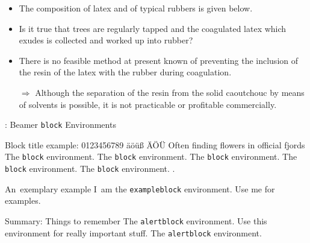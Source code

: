 \begin{frame}{\titleprefix}

	\begin{itemize}
		\item The composition of latex and of typical rubbers is given below.
		\item Is it true that trees are regularly tapped and the coagulated latex which exudes is collected and worked up into rubber?
	\end{itemize}

	\pause

	\begin{itemize}
		\item There is no feasible method at present known of preventing the inclusion of the resin of the latex with the rubber during coagulation.
		\item[$\Rightarrow$\hspace{-2.5pt}] Although the separation of the resin from the solid caoutchouc by means of solvents is possible, it is not practicable or profitable commercially.
	\end{itemize}

\end{frame}


\begin{frame}{\titleprefix: Beamer \texttt{block} Environments}

	\begin{block}{Block title example: 0123456789 äöüß ÄÖÜ Often finding flowers in official fjords}
		The \texttt{block} environment. The \texttt{block} environment. The \texttt{block} environment. The \texttt{block} environment. The \texttt{block} environment. \insertblocktitle.\strut  %
	\end{block}%

	\begin{exampleblock}{An~exemplary example}
		I~am the \texttt{exampleblock} environment. Use me for examples.\strut  %
	\end{exampleblock}

	\begin{alertblock}{Summary: Things to remember}
		The \texttt{alertblock} environment. Use this environment for really important stuff. The \texttt{alertblock} environment.\strut  %
	\end{alertblock}

\end{frame}


